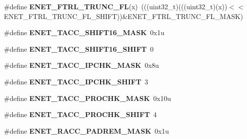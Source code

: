 \begin{DoxyCompactItemize}
\item 
\#define {\bfseries E\+N\+E\+T\+\_\+\+F\+T\+R\+L\+\_\+\+T\+R\+U\+N\+C\+\_\+\+FL}(x)~(((uint32\+\_\+t)(((uint32\+\_\+t)(x))$<$$<$E\+N\+E\+T\+\_\+\+F\+T\+R\+L\+\_\+\+T\+R\+U\+N\+C\+\_\+\+F\+L\+\_\+\+S\+H\+I\+FT))\&E\+N\+E\+T\+\_\+\+F\+T\+R\+L\+\_\+\+T\+R\+U\+N\+C\+\_\+\+F\+L\+\_\+\+M\+A\+SK)\hypertarget{group__ENET__Register__Masks_ga82b2ab08109ba85730009d0705983cb1}{}\label{group__ENET__Register__Masks_ga82b2ab08109ba85730009d0705983cb1}

\item 
\#define {\bfseries E\+N\+E\+T\+\_\+\+T\+A\+C\+C\+\_\+\+S\+H\+I\+F\+T16\+\_\+\+M\+A\+SK}~0x1u\hypertarget{group__ENET__Register__Masks_ga88e7d546b2d5198aaecb2755eeaca679}{}\label{group__ENET__Register__Masks_ga88e7d546b2d5198aaecb2755eeaca679}

\item 
\#define {\bfseries E\+N\+E\+T\+\_\+\+T\+A\+C\+C\+\_\+\+S\+H\+I\+F\+T16\+\_\+\+S\+H\+I\+FT}~0\hypertarget{group__ENET__Register__Masks_gad6be72a0d8613b7d2e2a173821caf724}{}\label{group__ENET__Register__Masks_gad6be72a0d8613b7d2e2a173821caf724}

\item 
\#define {\bfseries E\+N\+E\+T\+\_\+\+T\+A\+C\+C\+\_\+\+I\+P\+C\+H\+K\+\_\+\+M\+A\+SK}~0x8u\hypertarget{group__ENET__Register__Masks_gae79332fd3040e628268621a4525f8ce1}{}\label{group__ENET__Register__Masks_gae79332fd3040e628268621a4525f8ce1}

\item 
\#define {\bfseries E\+N\+E\+T\+\_\+\+T\+A\+C\+C\+\_\+\+I\+P\+C\+H\+K\+\_\+\+S\+H\+I\+FT}~3\hypertarget{group__ENET__Register__Masks_gaf007c15a11d87397188a6d940575309f}{}\label{group__ENET__Register__Masks_gaf007c15a11d87397188a6d940575309f}

\item 
\#define {\bfseries E\+N\+E\+T\+\_\+\+T\+A\+C\+C\+\_\+\+P\+R\+O\+C\+H\+K\+\_\+\+M\+A\+SK}~0x10u\hypertarget{group__ENET__Register__Masks_gad5d647fe5be39e4571d94f84415f4613}{}\label{group__ENET__Register__Masks_gad5d647fe5be39e4571d94f84415f4613}

\item 
\#define {\bfseries E\+N\+E\+T\+\_\+\+T\+A\+C\+C\+\_\+\+P\+R\+O\+C\+H\+K\+\_\+\+S\+H\+I\+FT}~4\hypertarget{group__ENET__Register__Masks_ga1ab45d57f4375fd64bc08ca9cb53341b}{}\label{group__ENET__Register__Masks_ga1ab45d57f4375fd64bc08ca9cb53341b}

\item 
\#define {\bfseries E\+N\+E\+T\+\_\+\+R\+A\+C\+C\+\_\+\+P\+A\+D\+R\+E\+M\+\_\+\+M\+A\+SK}~0x1u\hypertarget{group__ENET__Register__Masks_gafe0e825e683582136a9e9c723b59119a}{}\label{group__ENET__Register__Masks_gafe0e825e683582136a9e9c723b59119a}


\end{DoxyCompactItemize}
